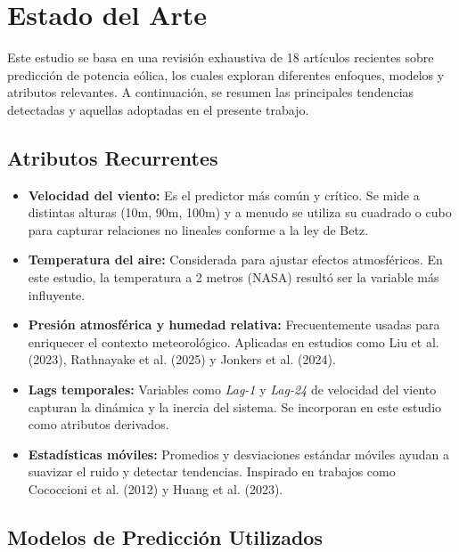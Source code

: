 \documentclass[conference]{IEEEtran}
\begin{document}
\section{Estado del Arte}

Este estudio se basa en una revisión exhaustiva de 18 artículos recientes sobre predicción de potencia eólica, los cuales exploran diferentes enfoques, modelos y atributos relevantes. A continuación, se resumen las principales tendencias detectadas y aquellas adoptadas en el presente trabajo.

\subsection{Atributos Recurrentes}

\begin{itemize}
	\item \textbf{Velocidad del viento:} Es el predictor más común y crítico. Se mide a distintas alturas (10m, 90m, 100m) y a menudo se utiliza su cuadrado o cubo para capturar relaciones no lineales conforme a la ley de Betz.
	
	\item \textbf{Temperatura del aire:} Considerada para ajustar efectos atmosféricos. En este estudio, la temperatura a 2 metros (NASA) resultó ser la variable más influyente.
	
	\item \textbf{Presión atmosférica y humedad relativa:} Frecuentemente usadas para enriquecer el contexto meteorológico. Aplicadas en estudios como Liu et al. (2023), Rathnayake et al. (2025) y Jonkers et al. (2024).
	
	\item \textbf{Lags temporales:} Variables como \textit{Lag-1} y \textit{Lag-24} de velocidad del viento capturan la dinámica y la inercia del sistema. Se incorporan en este estudio como atributos derivados.
	
	\item \textbf{Estadísticas móviles:} Promedios y desviaciones estándar móviles ayudan a suavizar el ruido y detectar tendencias. Inspirado en trabajos como Cococcioni et al. (2012) y Huang et al. (2023).
\end{itemize}

\subsection{Modelos de Predicción Utilizados}
\end{document}
